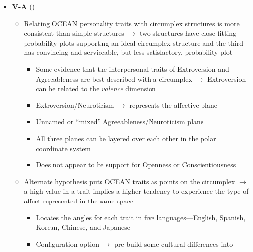\begin{itemize}
    \item \textbf{V-A} (\strong)
    \begin{itemize}
        \item Relating OCEAN personality traits with circumplex
        structures is more consistent than simple structures $\rightarrow$ two
        structures have close-fitting probability plots supporting an ideal
        circumplex structure and the third has convincing and
        serviceable, but less satisfactory, probability plot~\citep[p.~84--87,
        90]{gurtman1997studying}
        \begin{itemize}
            \item Some evidence that the interpersonal traits of Extroversion
            and Agreeableness are best described with a circumplex
            $\rightarrow$ Extroversion can be related to the \textit{valence}
            dimension~\citep[p.~590, 593]{mccrae1989structure}

            \item Extroversion/Neuroticism $\rightarrow$ represents the
            affective plane~\citep[p.~84--87, 90]{gurtman1997studying}

            \item Unnamed or ``mixed'' Agreeableness/Neuroticism
            plane~\citep[p.~84--87, 90]{gurtman1997studying}

            \item All three planes can be layered over each other in the polar
            coordinate system~\citep[p.~84--87, 90]{gurtman1997studying}

            \item Does not appear to be support for Openness or
            Conscientiousness~\citep[p.~84--87, 90]{gurtman1997studying}
        \end{itemize}

        \item Alternate hypothesis puts OCEAN traits as points on the
        circumplex $\rightarrow$ a high value in a trait implies a higher
        tendency to experience the type of affect represented in
        the same space~\citep[p.~94--96]{yik2002relating}
        \begin{itemize}
            \item Locates the angles for each trait in five
            languages---English, Spanish, Korean, Chinese, and Japanese

            \item Configuration option $\rightarrow$ pre-build some cultural
            differences into \progname{}
        \end{itemize}
    \end{itemize}


\end{itemize}
